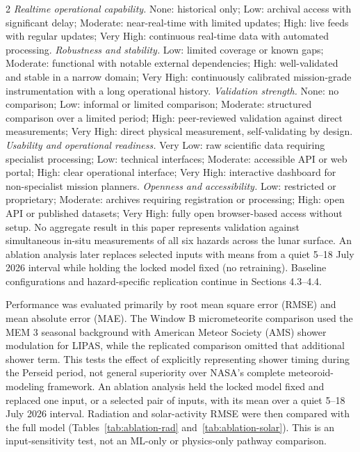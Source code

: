 \begin{multicols}{2}
\textit{Realtime operational capability.} None: historical only; Low: archival access with significant delay; Moderate: near-real-time with limited updates; High: live feeds with regular updates; Very High: continuous real-time data with automated processing. 
\textit{Robustness and stability.} Low: limited coverage or known gaps; Moderate: functional with notable external dependencies; High: well-validated and stable in a narrow domain; Very High: continuously calibrated mission-grade instrumentation with a long operational history. 
\textit{Validation strength.} None: no comparison; Low: informal or limited comparison; Moderate: structured comparison over a limited period; High: peer-reviewed validation against direct measurements; Very High: direct physical measurement, self-validating by design. 
\textit{Usability and operational readiness.} Very Low: raw scientific data requiring specialist processing; Low: technical interfaces; Moderate: accessible API or web portal; High: clear operational interface; Very High: interactive dashboard for non-specialist mission planners. 
\textit{Openness and accessibility.} Low: restricted or proprietary; Moderate: archives requiring registration or processing; High: open API or published datasets; Very High: fully open browser-based access without setup. No aggregate result in this paper represents validation against simultaneous in-situ measurements of all six hazards across the lunar surface. An ablation analysis later replaces selected inputs with means from a quiet 5--18 July 2026 interval while holding the locked model fixed (no retraining). Baseline configurations and hazard-specific replication continue in Sections 4.3--4.4.

Performance was evaluated primarily by root mean square error (RMSE) and mean absolute error (MAE). The Window B micrometeorite comparison used the MEM 3 seasonal background with American Meteor Society (AMS) shower modulation for LIPAS, while the replicated comparison omitted that additional shower term. This tests the effect of explicitly representing shower timing during the Perseid period, not general superiority over NASA's complete meteoroid-modeling framework. An ablation analysis held the locked model fixed and replaced one input, or a selected pair of inputs, with its mean over a quiet 5--18 July 2026 interval. Radiation and solar-activity RMSE were then compared with the full model (Tables~\ref{tab:ablation-rad} and~\ref{tab:ablation-solar}). This is an input-sensitivity test, not an ML-only or physics-only pathway comparison.


\end{multicols}
